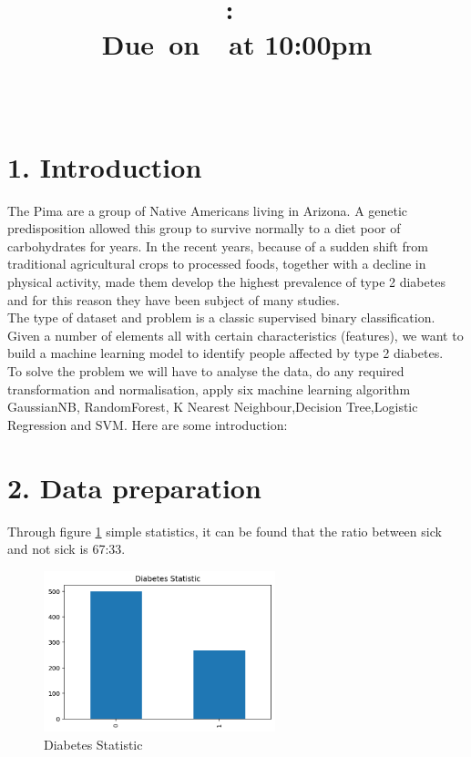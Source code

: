 \documentclass[11pt]{article}
\title{
    \vspace{2in}
    \textmd{\textbf{\hmwkClass:\ \hmwkTitle}}\\
    \normalsize\vspace{0.1in}\small{Due\ on\ \hmwkDueDate\ at 10:00pm}\\
    \vspace{0.1in}\large{\textit{\hmwkClassInstructor\ \hmwkClassTime}}
    \vspace{3in}
}
\author{\hmwkAuthorName}
\date{}
\begin{document}
\maketitle

\pagebreak

\section{1. Introduction}
The Pima are a group of Native Americans living in Arizona. A genetic predisposition allowed this group to survive normally to a diet poor of carbohydrates for years. In the recent years, because of a sudden shift from traditional agricultural crops to processed foods, together with a decline in physical activity, made them develop the highest prevalence of type 2 diabetes and for this reason they have been subject of many studies.\\
The type of dataset and problem is a classic supervised binary classification. Given a number of elements all with certain characteristics (features), we want to build a machine learning model to identify people affected by type 2 diabetes.\\
To solve the problem we will have to analyse the data, do any required transformation and normalisation, apply six machine learning algorithm GaussianNB, RandomForest, K Nearest Neighbour,Decision Tree,Logistic Regression and SVM. Here are some introduction:\\
\section{2. Data preparation}
Through figure \ref{f1} simple statistics, it can be found that the ratio between sick and not sick is 67:33.
\begin{figure}[H]
    \centering
    \includegraphics[width=0.6\textwidth]{ds}
    \caption{Diabetes Statistic}
    \label{f1}
\end{figure}
\end{document}
